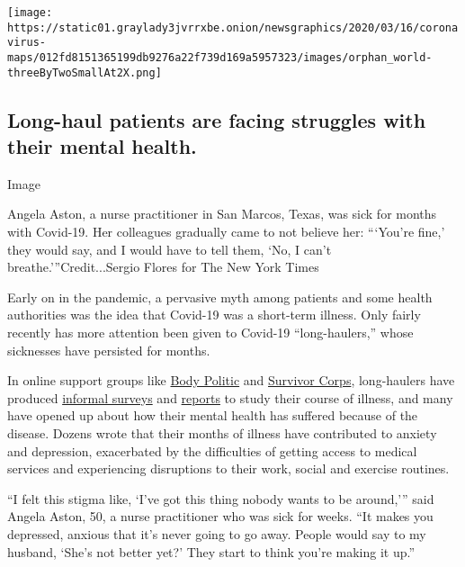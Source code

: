 \texttt{[image: https://static01.graylady3jvrrxbe.onion/newsgraphics/2020/03/16/coronavirus-maps/012fd8151365199db9276a22f739d169a5957323/images/orphan\_world-threeByTwoSmallAt2X.png]}

\hypertarget{long-haul-patients-are-facing-struggles-with-their-mental-health}{%
\subsection{Long-haul patients are facing struggles with their mental
health.}\label{long-haul-patients-are-facing-struggles-with-their-mental-health}}

Image

Angela Aston, a nurse practitioner in San Marcos, Texas, was sick for
months with Covid-19. Her colleagues gradually came to not believe her:
```You're fine,' they would say, and I would have to tell them, `No, I
can't breathe.'''Credit...Sergio Flores for The New York Times

Early on in the pandemic, a pervasive myth among patients and some
health authorities was the idea that Covid-19 was a short-term illness.
Only fairly recently has more attention been given to Covid-19
``long-haulers,'' whose sicknesses have persisted for months.

In online support groups like
\href{https://www.wearebodypolitic.com/covid19}{Body Politic} and
\href{https://www.facebookcorewwwi.onion/groups/COVID19survivorcorps/?multi_permalinks=786479422100919\&notif_id=1598482547497795\&notif_t=group_highlights\&ref=notif}{Survivor
Corps}, long-haulers have produced
\href{https://patientresearchcovid19.com/}{informal surveys} and
\href{https://docs.google.com/document/d/1KmLkOArlJem-PArnBMbSp-S_E3OozD47UzvRG4qM5Yk/edit}{reports}
to study their course of illness, and many have opened up about how
their mental health has suffered because of the disease. Dozens wrote
that their months of illness have contributed to anxiety and depression,
exacerbated by the difficulties of getting access to medical services
and experiencing disruptions to their work, social and exercise
routines.

``I felt this stigma like, `I've got this thing nobody wants to be
around,''' said Angela Aston, 50, a nurse practitioner who was sick for
weeks. ``It makes you depressed, anxious that it's never going to go
away. People would say to my husband, `She's not better yet?' They start
to think you're making it up.''

\href{https://www.nytimes3xbfgragh.onion/news-event/coronavirus?action=click\&pgtype=Article\&state=default\&region=MAIN_CONTENT_3\&context=storylines_faq}{}

